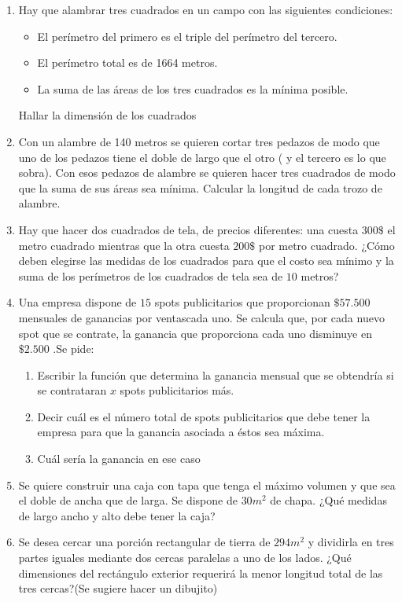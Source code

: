 \documentclass[12pt]{article}
\theoremstyle{definition}
\begin{document}
\begin{enumerate}

\item  
Hay que alambrar tres cuadrados en un campo con las siguientes condiciones:
\begin{itemize}
\item El perímetro del primero es el triple del perímetro del tercero.
\item El perímetro total es de 1664 metros.
\item La suma de las áreas de los tres cuadrados es la mínima posible.
\end{itemize}
Hallar la dimensión de los cuadrados

\item  
Con un alambre de 140 metros se quieren cortar tres pedazos de modo que uno de los pedazos tiene el doble de largo que el otro ( y el tercero es lo que sobra). Con esos pedazos de alambre se quieren hacer tres cuadrados de modo que la suma de sus áreas sea mínima. Calcular la longitud de cada trozo de alambre. 

\item  
Hay que hacer dos cuadrados de tela, de precios diferentes: una cuesta $300\$ $ el metro cuadrado mientras que la otra cuesta $200\$$ por metro cuadrado. ¿Cómo deben elegirse las medidas de los cuadrados para que el costo sea mínimo y la suma de los perímetros de los cuadrados de tela sea de $10$ metros?

\item  
Una empresa dispone de $15$ spots publicitarios que proporcionan $\$57.500$ mensuales de ganancias por ventascada uno. Se calcula que, por cada nuevo spot que se contrate, la ganancia que proporciona cada uno disminuye en $\$2.500$ .Se pide:
\begin{enumerate}
\item Escribir la función que determina la ganancia mensual que se obtendría si se contrataran $x$ spots publicitarios más.
\item Decir cuál es el número total de spots publicitarios que debe tener la empresa para que la ganancia asociada a éstos sea máxima.
\item Cuál sería la ganancia en ese caso
\end{enumerate}

\item  
Se quiere construir una caja con tapa que tenga el máximo volumen y que sea el doble de ancha que de larga. Se dispone de $30 m^2$ de chapa. ¿Qué medidas de largo ancho y alto debe tener la caja?

\item  
 Se desea cercar una porción rectangular de tierra de $294 m^2$  y dividirla en tres partes iguales mediante dos cercas paralelas a uno de los lados. ¿Qué dimensiones del rectángulo exterior requerirá la menor longitud total de las tres cercas?(Se sugiere hacer un dibujito)



\end{enumerate}
\end{document}
